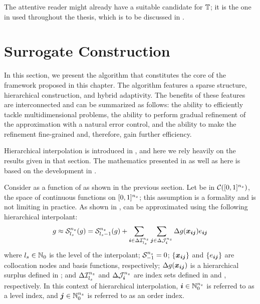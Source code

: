 The attentive reader might already have a suitable candidate for $\transform$;
it is the one in  used throughout the thesis,
which is to be discussed in .

\section{Surrogate Construction}

In this section, we present the algorithm that constitutes the core of the
framework proposed in this chapter. The algorithm features a sparse structure,
hierarchical construction, and hybrid adaptivity. The benefits of these features
are interconnected and can be summarized as follows: the ability to efficiently
tackle multidimensional problems, the ability to perform gradual refinement of
the approximation with a natural error control, and the ability to make the
refinement fine-grained and, therefore, gain further efficiency.

Hierarchical interpolation is introduced in , and
here we rely heavily on the results given in that section. The mathematics
presented in  as well as here is based on the
development in \cite{klimke2006, ma2009, jakeman2012}.

Consider \g as a function of \vz as shown in the previous section. Let \g be in
$\mathcal{C}([0, 1]^{n_{z}})$, the space of continuous functions on $[0, 1]^{n_{z}}$;
this assumption is a formality and is not limiting in practice. As shown in
, \g can be approximated using the following
hierarchical interpolant:
\begin{equation} \elab{interpolant-sparse}
  \g \approx \interpolant{\nz}{\ls}(\g)
  = \interpolant{\nz}{\ls - 1}(\g) + \sum_{\vi \in \Delta\sparseindex{\nz}{\ls}} \sum_{\vj \in \Delta\tensorindex{\nz}{\vi}} \Delta\g(\vx_{\vi \vj}) e_{\vi \vj}
\end{equation}
where ${l_{s}} \in \mathbb{N}_{0}$ is the level of the interpolant; $\mathcal{S}^{{n_{z}}}_{-1}
= 0$; $\{ \boldsymbol{x}_{\boldsymbol{i} \boldsymbol{j}} \}$ and $\{ e_{\boldsymbol{i} \boldsymbol{j}} \}$ are collocation nodes and
basis functions, respectively; $\Delta g(\boldsymbol{x}_{\boldsymbol{i} \boldsymbol{j}})$ is a hierarchical
surplus defined in ; and
$\Delta\mathcal{I}^{{n_{z}}}_{{l_{s}}}$ and $\Delta\mathcal{J}^{{n_{z}}}_{\boldsymbol{i}}$ are index sets
defined in  and
, respectively. In this context of
hierarchical interpolation, $\boldsymbol{i} \in \mathbb{N}_{0}^{n_{z}}$ is referred to as a level
index, and $\boldsymbol{j} \in \mathbb{N}_{0}^{n_{z}}$ is referred to as an order index.

